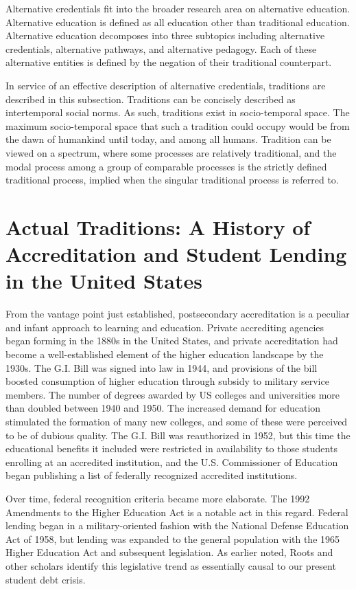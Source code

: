 \documentclass[AER]{/Users/zyl357/Documents/GitHub/research-dissertation-case-for-alt-ed/papers/alt-ed-survey/aea-latex-templates/AEA}
\begin{document}
Alternative credentials fit into the broader research area on alternative
education. Alternative education is defined as all education other than
traditional education. Alternative education decomposes into three
subtopics including alternative credentials, alternative pathways, and
alternative pedagogy. Each of these alternative entities is defined by the
negation of their traditional counterpart.

In service of an effective description of alternative credentials,
traditions are described in this subsection. Traditions can be concisely
described as intertemporal social norms. As such, traditions exist in
socio-temporal space. The maximum socio-temporal space that such a
tradition could occupy would be from the dawn of humankind until today,
and among all humans. Tradition can be viewed on a spectrum, where some
processes are relatively traditional, and the modal process among a group
of comparable processes is the strictly defined traditional process,
implied when the singular traditional process is referred to.

\section{Actual Traditions: A History of Accreditation and Student
Lending in the United States}

From the vantage point just established, postsecondary accreditation is a
peculiar and infant approach to learning and education. Private
accrediting agencies began forming in the 1880s in the United States, and
private accreditation had become a well-established element of the higher
education landscape by the 1930s\cite{ace_2019}. The G.I. Bill was signed into law in
1944\cite{sullings_2019}, and provisions of the bill boosted consumption of higher education
through subsidy to military service members. The number of degrees awarded
by US colleges and universities more than doubled between 1940 and 1950.
The increased demand for education stimulated the formation of many new
colleges, and some of these were perceived to be of dubious quality\cite{wellman_1998}. The
G.I. Bill was reauthorized in 1952, but this time the educational benefits
it included were restricted in availability to those students enrolling at
an accredited institution, and the U.S. Commissioner of Education began
publishing a list of federally recognized accredited institutions.

Over time, federal recognition criteria became more elaborate. The 1992
Amendments to the Higher Education Act is a notable act in this regard.
Federal lending began in a military-oriented fashion with the National
Defense Education Act of 1958, but lending was expanded to the general
population with the 1965 Higher Education Act and subsequent legislation\cite{lumina_2019}.
As earlier noted, Roots and other scholars identify this legislative trend
as essentially causal to our present student debt crisis.
\end{document}
